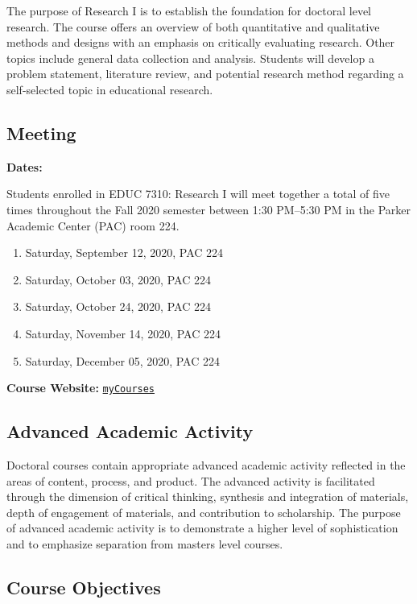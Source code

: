 \documentclass[
]{article}
\providecommand{\tightlist}{%
  \setlength{\itemsep}{0pt}\setlength{\parskip}{0pt}}
\begin{document}
The purpose of Research I is to establish the foundation for doctoral
level research. The course offers an overview of both quantitative and
qualitative methods and designs with an emphasis on critically
evaluating research. Other topics include general data collection and
analysis. Students will develop a problem statement, literature review,
and potential research method regarding a self-selected topic in
educational research.

\subsection{Meeting}

\textbf{Dates:}

Students enrolled in EDUC 7310: Research I will meet together a total of
five times throughout the Fall 2020 semester between 1:30 PM--5:30 PM in
the Parker Academic Center (PAC) room 224.

\begin{enumerate}
\def\labelenumi{\arabic{enumi}.}
\tightlist
\item
  Saturday, September 12, 2020, PAC 224
\item
  Saturday, October 03, 2020, PAC 224
\item
  Saturday, October 24, 2020, PAC 224
\item
  Saturday, November 14, 2020, PAC 224
\item
  Saturday, December 05, 2020, PAC 224
\end{enumerate}

\textbf{Course Website:}
\texttt{\href{https://mycourses.umhb.edu/courses/23592}{myCourses}}

\newpage
\subsection{Advanced Academic Activity}

Doctoral courses contain appropriate advanced academic activity
reflected in the areas of content, process, and product. The advanced
activity is facilitated through the dimension of critical thinking,
synthesis and integration of materials, depth of engagement of
materials, and contribution to scholarship. The purpose of advanced
academic activity is to demonstrate a higher level of sophistication and
to emphasize separation from masters level courses.

\subsection{Course Objectives}
\end{document}

